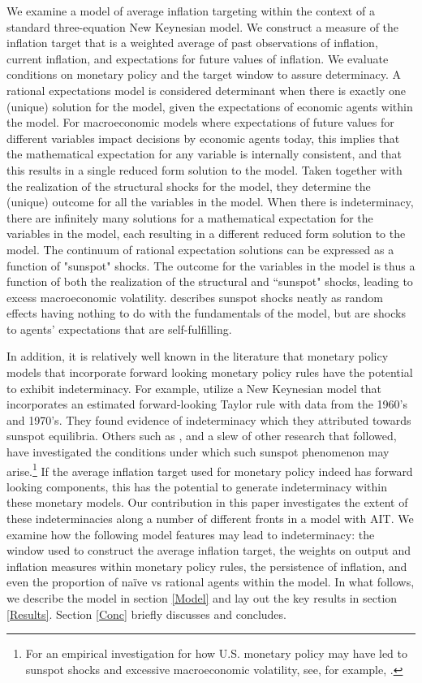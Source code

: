 \documentclass[english,authoryear,12pt]{elsarticle}
\begin{document}
We examine a model of average inflation targeting within the context of a standard three-equation New Keynesian model. We construct a measure of the inflation target that is a weighted average of past observations of inflation, current inflation, and expectations for future values of inflation. We evaluate conditions on monetary policy and the target window to assure determinacy. A rational expectations model is considered determinant when there is exactly one (unique) solution for the model, given the expectations of economic agents within the model. For macroeconomic models where expectations of future values for different variables impact decisions by economic agents today, this implies that the mathematical expectation for any variable is internally consistent, and that this results in a single reduced form solution to the model. Taken together with the realization of the structural shocks for the model, they determine the (unique) outcome for all the variables in the model. When there is indeterminacy, there are infinitely many solutions for a mathematical expectation for the variables in the model, each resulting in a different reduced form solution to the model. The continuum of rational expectation solutions can be expressed as a function of "sunspot" shocks. The outcome for the variables in the model is thus a function of both the realization of the structural and ``sunspot" shocks, leading to excess macroeconomic volatility. \cite{woodford1987} describes sunspot shocks neatly as random effects having nothing to do with the fundamentals of the model, but are shocks to agents' expectations that are self-fulfilling. 

In addition, it is relatively well known in the literature that monetary policy models that incorporate forward looking monetary policy rules have the potential to exhibit indeterminacy. For example, \cite{clarida2000monetary} utilize a New Keynesian model that incorporates an estimated forward-looking Taylor rule with data from the 1960's and 1970's. They found evidence of indeterminacy which they attributed towards sunspot equilibria. Others such as \cite{evans2005monetary}, and a slew of other research that followed, have investigated the conditions under which such sunspot phenomenon may arise.\footnote{For an empirical investigation for how U.S. monetary policy may have led to sunspot shocks and excessive macroeconomic volatility, see, for example, \cite{lubik2004}.} If the average inflation target used for monetary policy indeed has forward looking components, this has the potential to generate indeterminacy within these monetary models. Our contribution in this paper investigates the extent of these indeterminacies along a number of different fronts in a model with AIT. We examine how the following model features may lead to indeterminacy: the window used to construct the average inflation target, the weights on output and inflation measures within monetary policy rules, the persistence of inflation, and even the proportion of na\"ive vs rational agents within the model. In what follows, we describe the model in section \ref*{Model} and lay out the key results in section \ref*{Results}. Section \ref*{Conc} briefly discusses and concludes.
\end{document}
